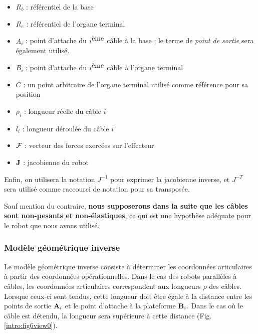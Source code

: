 \begin{itemize}
 \item $R_b$ : référentiel de la base
 \item $R_e$ : référentiel de l'organe terminal
 \item $A_i$ : point d'attache du $i^{\hbox{ème}}$ câble à la base ; le terme de {\it point de sortie} sera également utilisé.
 \item $B_i$ : point d'attache du $i^{\hbox{ème}}$ câble à l'organe terminal
 \item $C$ : un point arbitraire de l'organe terminal utilisé comme référence pour sa position
 \item $\rho_i$ : longueur réelle du câble $i$
 \item $l_i$ : longueur déroulée du câble $i$
 \item $\bf {\mathcal F}$ : vecteur des forces exercées sur l'effecteur
 \item $\bf J$ : jacobienne du robot
\end{itemize}
Enfin, on utilisera la notation $J^{-1}$ pour exprimer la jacobienne inverse, et $J^{-T}$ sera utilisé comme raccourci de notation pour sa transposée.

Sauf mention du contraire, {\bf nous supposerons dans la suite que les câbles sont non-pesants et non-élastiques}, ce qui est une hypothèse adéquate pour le robot que nous avons utilisé.

\subsubsection{Modèle géométrique inverse}

Le modèle géométrique inverse consiste à déterminer les coordonnées articulaires à partir des coordonnées opérationnelles. Dans le cas des robots parallèles à câbles, les coordonnées articulaires correspondent aux longueurs $\rho$ des câbles. Lorsque ceux-ci sont tendus, cette longueur doit être égale à la distance entre les points de sortie ${\bf A}_i$ et le point d'attache à la plateforme ${\bf B}_i$. Dans le cas où le câble est détendu, la longueur sera supérieure à cette distance (Fig.\ref{intro:fig6view0}).\\


